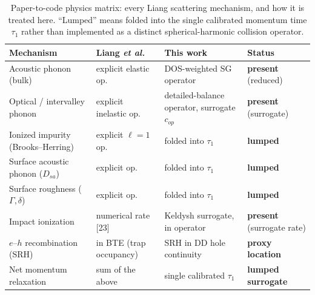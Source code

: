 \documentclass[11pt]{article}
\begin{document}
\begin{table}[h]\centering\small
\caption{Paper-to-code physics matrix: every Liang scattering mechanism, and how it is treated
here. ``Lumped'' means folded into the single calibrated momentum time $\tau_1$ rather than
implemented as a distinct spherical-harmonic collision operator.}\label{tab:physmatrix}
\begin{tabular}{p{4.6cm}p{3.4cm}p{3.4cm}p{2.6cm}}
\toprule
Mechanism & Liang \emph{et al.} & This work & Status \\
\midrule
Acoustic phonon (bulk) & explicit elastic op. & DOS-weighted SG operator & \textbf{present} (reduced) \\
Optical / intervalley phonon & explicit inelastic op. & detailed-balance operator, surrogate $c_{op}$ & \textbf{present} (surrogate) \\
Ionized impurity (Brooks--Herring) & explicit $\ell{=}1$ op. & folded into $\tau_1$ & \textbf{lumped} \\
Surface acoustic phonon ($D_{sa}$) & explicit op. & folded into $\tau_1$ & \textbf{lumped} \\
Surface roughness ($\Gamma,\delta$) & explicit op. & folded into $\tau_1$ & \textbf{lumped} \\
Impact ionization & numerical rate [23] & Keldysh surrogate, in operator & \textbf{present} (surrogate rate) \\
$e$--$h$ recombination (SRH) & in BTE (trap occupancy) & SRH in DD hole continuity & \textbf{proxy location} \\
Net momentum relaxation & sum of the above & single calibrated $\tau_1$ & \textbf{lumped surrogate} \\
\bottomrule
\end{tabular}
\end{table}
\end{document}
